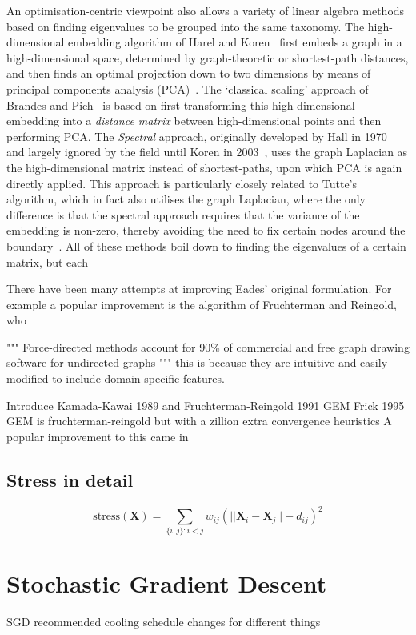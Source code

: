 An optimisation-centric viewpoint also allows a variety of linear algebra methods based on finding eigenvalues to be grouped into the same taxonomy.
The high-dimensional embedding algorithm of Harel and Koren~\cite{hde} first embeds a graph in a high-dimensional space, determined by graph-theoretic or shortest-path distances, and then finds an optimal projection down to two dimensions by means of principal components analysis (PCA)~\cite{pca}.
The `classical scaling' approach of Brandes and Pich~\cite{brandes_eigensolver} is based on first transforming this high-dimensional embedding into a \emph{distance matrix} between high-dimensional points and then performing PCA.
The \emph{Spectral} approach, originally developed by Hall in 1970~\cite{hall} and largely ignored by the field until Koren in 2003~\cite{koren_spectral}, uses the graph Laplacian as the high-dimensional matrix instead of shortest-paths, upon which PCA is again directly applied. This approach is particularly closely related to Tutte's algorithm, which in fact also utilises the graph Laplacian, where the only difference is that the spectral approach requires that the variance of the embedding is non-zero, thereby avoiding the need to fix certain nodes around the boundary~\cite{koren_spectral}.
All of these methods boil down to finding the eigenvalues of a certain matrix, but each 

There have been many attempts at improving Eades' original formulation. For example a popular improvement is the algorithm of Fruchterman and Reingold, who 

"""
Force-directed methods account for 90\% of commercial and free graph drawing software for undirected graphs
"""
this is because they are intuitive and easily modified to include domain-specific features.


Introduce Kamada-Kawai 1989 and Fruchterman-Reingold 1991 GEM Frick 1995
GEM is fruchterman-reingold but with a zillion extra convergence heuristics
A popular improvement to this came in 


\subsection{Stress in detail}
\begin{equation}
    \mathrm{stress}(\mathbf{X}) = \sum_{\{i,j\}:i<j}w_{ij}(||\mathbf{X}_i-\mathbf{X}_j||-d_{ij})^2
\end{equation}


\section{Stochastic Gradient Descent}
SGD
recommended cooling schedule changes for different things
